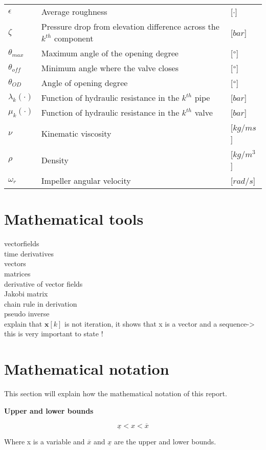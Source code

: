 \begin{tabular}{l l l}
	$\epsilon$		&	Average roughness									     	& [$\cdot$]\\
	$\zeta$			&	Pressure drop from elevation difference across the $k^{th}$ component	& [$bar$]\\
	$\theta_{max}$	&	Maximum angle of the opening degree						    & [$\degree$]\\
	$\theta_{off}$	&	Minimum angle where the valve closes						& [$\degree$]\\
	$\theta_{OD}$	&	Angle of opening degree										& [$\degree$]\\
	$\lambda_k(\cdot)$	&	Function of hydraulic resistance in the $k^{th}$ pipe		& [$bar$]\\
	$\mu_k(\cdot)$		&	Function of hydraulic resistance in the $k^{th}$ valve		& [$bar$]\\
	$\nu$			&	Kinematic viscosity									     	& [$kg/ms$]\\
	$\rho$			&	Density									     				& [$kg/m^3$]\\
	$\omega_r$		&	Impeller angular velocity									& [$rad/s$]\\
	
\end{tabular}

\section*{Mathematical tools}
vectorfields
\\
time derivatives
\\
vectors
\\
matrices
\\
derivative of vector fields
\\
Jakobi matrix
\\
chain rule in derivation
\\
pseudo inverse
\\
explain that $\bm{x}[k]$ is not iteration, it shows that x is a vector and a sequence-> this is very important to state ! 


\section*{Mathematical notation}

This section will explain how the mathematical notation of this report. 

\textbf{Upper and lower bounds}




\begin{equation}
\underline{x} < x < \overline{x} 
\end{equation}

 Where x is a variable and $\overline{x}$ and $\underline{x}$ are the upper and lower bounds.

